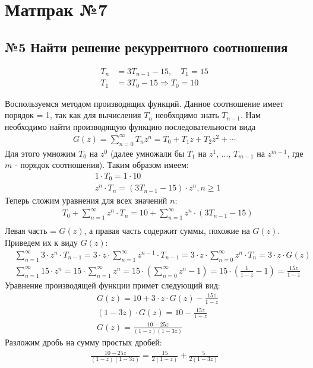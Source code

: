 \documentclass[a4paper,12pt,numbers=noenddot]{scrreprt}
\begin{document}

\chapter{Матпрак №7} 

\section{№5 Найти решение рекуррентного соотношения}

\begin{align}
    T_n &= 3T_{n-1} - 15, \quad T_1 = 15 \\
    T_1 &= 3T_0 - 15 \Rightarrow T_0 = 10
\end{align}

\begin{flushleft}
Воспользуемся методом производящих функций. Данное соотношение имеет порядок = 1, так как для вычисления $T_n$ необходимо знать $T_{n-1}$.
Нам необходимо найти производящую функцию последовательности вида
\begin{align} 
    G(z) = \sum_{n=0}^{\infty} T_n z^n = T_0 + T_1 z + T_2 z^2 + \cdots
\end{align}
Для этого умножим $T_0$ на $z^0$ (далее умножали бы $T_1$ на $z^1$, ..., $T_{m-1}$ на $z^{m-1}$, где $m$ - порядок соотношения). Таким образом имеем:
\begin{align}
    & 1\cdot T_0=1\cdot 10 \\&
    z^n\cdot T_n=(3T_{n-1}-15)\cdot z^n, n \geq 1
\end{align}
Теперь сложим уравнения для всех значений $n$:
\begin{align}
    & T_0 + \sum_{n=1}^{\infty} z^n \cdot T_n = 10 + \sum_{n=1}^{\infty} z^n \cdot (3T_{n-1}-15) \\&
\end{align}
Левая часть = $G(z)$, а правая часть содержит суммы, похожие на $G(z)$. Приведем их к виду $G(z)$:
\begin{align}
    & \sum_{n=1}^{\infty} 3 \cdot z^n \cdot T_{n-1} = 3 \cdot z \cdot \sum_{n=1}^{\infty} z^{n-1} \cdot T_{n-1} = 3 \cdot z \cdot \sum_{n=0}^{\infty} z^{n} \cdot T_{n} = 3 \cdot z \cdot G(z) \\&
    \sum_{n=1}^{\infty} 15 \cdot z^n = 15 \cdot \sum_{n=1}^{\infty} z^n = 15 \cdot (\sum_{n=0}^{\infty} z^n - 1) = 15 \cdot (\frac{1}{1 - z} - 1) = \frac{15z}{1 - z}
\end{align}
Уравнение производящей функции примет следующий вид:
\begin{align}
    & G(z) = 10 + 3 \cdot z \cdot G(z) - \frac{15z}{1-z} \\&
    (1-3z) \cdot G(z) = 10 - \frac{15z}{1-z} \\&
    G(z)= \frac{10-25z}{(1-z)(1-3z)}
\end{align}
Разложим дробь на сумму простых дробей:
\begin{align}
    \frac{10-25z}{(1-z)(1-3z)} = \frac{15}{2(1-z)} + \frac{5}{2(1-3z)}
\end{align}
\end{flushleft}
\end{document}
